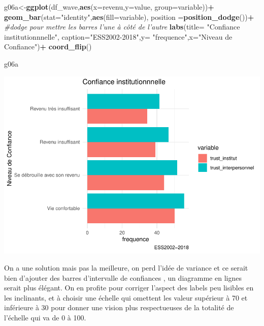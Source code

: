 \documentclass[
]{book}
\newenvironment{Shaded}{\begin{snugshade}}{\end{snugshade}}
\newcommand{\CommentTok}[1]{\textcolor[rgb]{0.56,0.35,0.01}{\textit{#1}}}
\newcommand{\DataTypeTok}[1]{\textcolor[rgb]{0.13,0.29,0.53}{#1}}
\newcommand{\KeywordTok}[1]{\textcolor[rgb]{0.13,0.29,0.53}{\textbf{#1}}}
\newcommand{\NormalTok}[1]{#1}
\newcommand{\OperatorTok}[1]{\textcolor[rgb]{0.81,0.36,0.00}{\textbf{#1}}}
\newcommand{\StringTok}[1]{\textcolor[rgb]{0.31,0.60,0.02}{#1}}
\begin{document}
\begin{Shaded}
\begin{Highlighting}[]
\NormalTok{g06a<-}\KeywordTok{ggplot}\NormalTok{(df_wave,}\KeywordTok{aes}\NormalTok{(}\DataTypeTok{x=}\NormalTok{revenu,}\DataTypeTok{y=}\NormalTok{value, }\DataTypeTok{group=}\NormalTok{variable))}\OperatorTok{+}
\StringTok{  }\KeywordTok{geom_bar}\NormalTok{(}\DataTypeTok{stat=}\StringTok{"identity"}\NormalTok{,}\KeywordTok{aes}\NormalTok{(}\DataTypeTok{fill=}\NormalTok{variable), }\DataTypeTok{position =}\KeywordTok{position_dodge}\NormalTok{())}\OperatorTok{+}\StringTok{            }\CommentTok{#dodge pour mettre les barres l'une à côté de l'autre}
\StringTok{  }\KeywordTok{labs}\NormalTok{(}\DataTypeTok{title=} \StringTok{"Confiance institutionnnelle"}\NormalTok{, }\DataTypeTok{caption=}\StringTok{"ESS2002-2018"}\NormalTok{,}\DataTypeTok{y=} \StringTok{"frequence"}\NormalTok{,}\DataTypeTok{x=}\StringTok{"Niveau de Confiance"}\NormalTok{)}\OperatorTok{+}
\StringTok{  }\KeywordTok{coord_flip}\NormalTok{()}

\NormalTok{g06a}
\end{Highlighting}
\end{Shaded}

\includegraphics{bookdown-demo_files/figure-latex/0420-1.pdf}

On a une solution mais pas la meilleure, on perd l'idée de variance et ce serait bien d'ajouter des barres d'intervalle de confiances , un diagramme en lignes serait plus élégant. On en profite pour corriger l'aspect des labels peu lisibles en les inclinants, et à choisir une échelle qui omettent les valeur supérieur à 70 et inférieure à 30 pour donner une vision plus respectueuses de la totalité de l'échelle qui va de 0 à 100.
\end{document}
